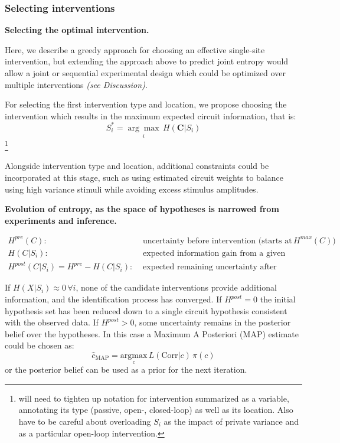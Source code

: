 \documentclass{article}
\begin{document}
\hypertarget{sec:methods-entropy-selection}{%
\subsubsection{Selecting interventions}\label{sec:methods-entropy-selection}}

\textbf{Selecting the optimal intervention.}

Here, we describe a greedy approach for choosing an effective single-site intervention, but extending the approach above to predict joint entropy would allow a joint or sequential experimental design which could be optimized over multiple interventions \emph{(see Discussion)}.

For selecting the first intervention type and location, we propose choosing the intervention which results in the maximum expected circuit information, that is:
\[S_i^* = \underset{i}{\arg\max}\,H(\mathbf{C}|S_i)\]\footnote{will need
  to tighten up notation for intervention summarized as a variable,
  annotating its type (passive, open-, closed-loop) as well as its
  location. Also have to be careful about overloading \(S_i\) as the
  impact of private variance and as a particular open-loop intervention.}

Alongside intervention type and location, additional constraints could be incorporated at this stage, such as using estimated circuit weights to balance using high variance stimuli while avoiding excess stimulus amplitudes.

\textbf{Evolution of entropy, as the space of hypotheses is narrowed from experiments and inference.}

\[
\begin{aligned}
H^{pre}(C):& \text{ uncertainty before intervention (starts at}\, H^{max}(C))\\
H(C|S_i):& \text{ expected information gain from a given intervention}\\
H^{post}(C|S_i) = H^{pre} - H(C|S_i):& \text{ expected remaining uncertainty after intervention}
\end{aligned}
\]

If \(H(X|S_i)\approx0 \,\forall i\), none of the candidate interventions provide additional information, and the identification process has converged. If \(H^{post} = 0\) the initial hypothesis set has been reduced down to a single circuit hypothesis consistent with the observed data. If \(H^{post} > 0\), some uncertainty remains in the posterior belief over the hypotheses. In this case a Maximum A Posteriori (MAP)
estimate could be chosen as:
\[ \hat{c}_{\text{MAP}} = \underset{c}{\text{argmax}} \,L(\text{Corr} | c)\,\pi(c) \]
or the posterior belief can be used as a prior for the next iteration.
\end{document}
